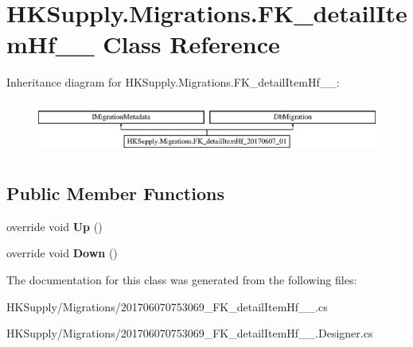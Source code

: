 \hypertarget{class_h_k_supply_1_1_migrations_1_1_f_k__detail_item_hf__20170607__01}{}\section{H\+K\+Supply.\+Migrations.\+F\+K\+\_\+detail\+Item\+Hf\+\_\+\_ Class Reference}
\label{class_h_k_supply_1_1_migrations_1_1_f_k__detail_item_hf__20170607__01}
Inheritance diagram for H\+K\+Supply.\+Migrations.\+F\+K\+\_\+detail\+Item\+Hf\+\_\+\_\+:\begin{figure}[H]
\begin{center}
\leavevmode
\includegraphics[height=1.777778cm]{class_h_k_supply_1_1_migrations_1_1_f_k__detail_item_hf__20170607__01}
\end{center}
\end{figure}
\subsection*{Public Member Functions}
\begin{DoxyCompactItemize}
\item 
\mbox{\label{class_h_k_supply_1_1_migrations_1_1_f_k__detail_item_hf__20170607__01_a2f53ed670d4ab3d39210cb3a3aa77471}} 
override void {\bfseries Up} ()
\item 
\mbox{\label{class_h_k_supply_1_1_migrations_1_1_f_k__detail_item_hf__20170607__01_a85ed0c8558cb9824bb10c4a772ddde37}} 
override void {\bfseries Down} ()
\end{DoxyCompactItemize}


The documentation for this class was generated from the following files\+:\begin{DoxyCompactItemize}
\item 
H\+K\+Supply/\+Migrations/201706070753069\+\_\+\+F\+K\+\_\+detail\+Item\+Hf\+\_\+\_.\+cs\item 
H\+K\+Supply/\+Migrations/201706070753069\+\_\+\+F\+K\+\_\+detail\+Item\+Hf\+\_\+\_.\+Designer.\+cs\end{DoxyCompactItemize}
